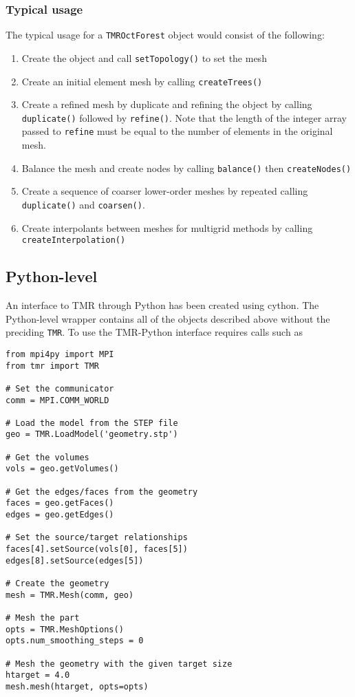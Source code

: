 \documentclass[12pt]{article}
\begin{document}
\subsubsection{Typical usage}

The typical usage for a \texttt{TMROctForest} object would consist of the following:
\begin{enumerate}
\item Create the object and call \texttt{setTopology()} to set the mesh
\item Create an initial element mesh by calling \texttt{createTrees()}
\item Create a refined mesh by duplicate and refining the object by calling \texttt{duplicate()} followed by \texttt{refine()}. Note that the length of the integer array passed to \texttt{refine} must be equal to the number of elements in the original mesh.
\item Balance the mesh and create nodes by calling \texttt{balance()} then \texttt{createNodes()}
\item Create a sequence of coarser lower-order meshes by repeated calling \texttt{duplicate()} and \texttt{coarsen()}.
\item Create interpolants between meshes for multigrid methods by calling \texttt{createInterpolation()}
\end{enumerate}


\subsection{Python-level}

An interface to TMR through Python has been created using cython.
The Python-level wrapper contains all of the objects described above without the preciding \texttt{TMR}. 
To use the TMR-Python interface requires calls such as
\begin{verbatim}
from mpi4py import MPI
from tmr import TMR

# Set the communicator
comm = MPI.COMM_WORLD

# Load the model from the STEP file
geo = TMR.LoadModel('geometry.stp')

# Get the volumes
vols = geo.getVolumes()

# Get the edges/faces from the geometry
faces = geo.getFaces()
edges = geo.getEdges()

# Set the source/target relationships
faces[4].setSource(vols[0], faces[5])
edges[8].setSource(edges[5])

# Create the geometry
mesh = TMR.Mesh(comm, geo)

# Mesh the part
opts = TMR.MeshOptions()
opts.num_smoothing_steps = 0

# Mesh the geometry with the given target size
htarget = 4.0
mesh.mesh(htarget, opts=opts)
\end{verbatim}
\end{document}

